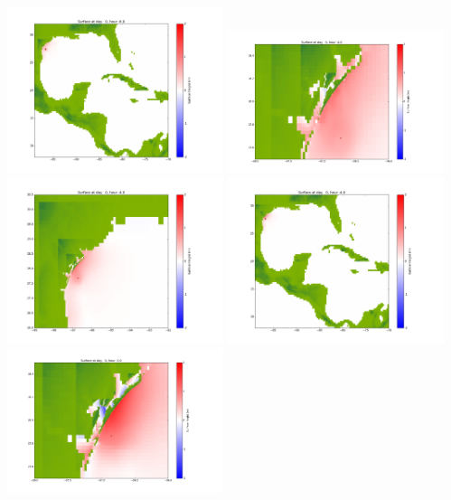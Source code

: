 \documentclass[11pt]{article}
\begin{document}
\vskip 10pt 
\includegraphics[width=0.475\textwidth]{frame0021fig1003.png}
\vskip 10pt 
\includegraphics[width=0.475\textwidth]{frame0022fig1001.png}
\includegraphics[width=0.475\textwidth]{frame0022fig1002.png}
\vskip 10pt 
\includegraphics[width=0.475\textwidth]{frame0022fig1003.png}
\vskip 10pt 
\includegraphics[width=0.475\textwidth]{frame0023fig1001.png}
\end{document}
